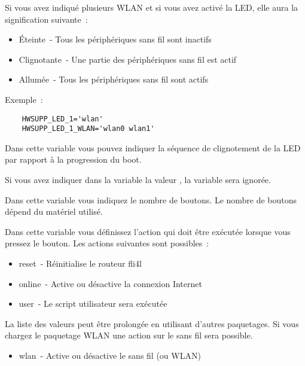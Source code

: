 \begin{description}
  Si vous avez indiqué plusieurs WLAN et si vous avez activé la LED, elle aura
  la signification suivante~:

  \begin{itemize}
    \item Éteinte~- Tous les périphériques sans fil sont inactifs
    \item Clignotante~- Une partie des périphériques sans fil est actif
    \item Allumée~- Tous les périphériques sans fil sont actifs
  \end{itemize}

  Exemple~:
  \begin{verbatim}
    HWSUPP_LED_1='wlan'
    HWSUPP_LED_1_WLAN='wlan0 wlan1'
  \end{verbatim}


  Dans cette variable vous pouvez indiquer la séquence de clignotement de la LED par rapport
  à la progression du boot.

  Si vous avez indiquer dans la variable la valeur ,
  la variable  sera ignorée.


  Dans cette variable vous indiquez le nombre de boutons. Le nombre de boutons
  dépend du matériel utilisé.


  Dans cette variable vous définissez l'action qui doit être exécutée lorsque
  vous pressez le bouton. Les actions suivantes sont possibles~:

  \begin{itemize}
    \item reset~- Réinitialise le routeur fli4l
    \item online~- Active ou désactive la connexion Internet
    \item user~- Le script utilisateur sera exécutée
  \end{itemize}

  La liste des valeurs peut être prolongée en utilisant d'autres paquetages.
  Si vous chargez le paquetage WLAN une action sur le sans fil sera possible.

  \begin{itemize}
    \item wlan~- Active ou désactive le sans fil (ou WLAN)
  \end{itemize}


\end{description}
